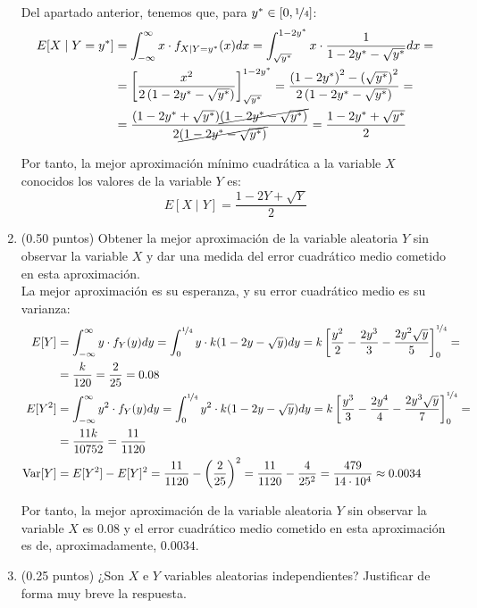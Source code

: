 \documentclass[12pt]{article}
\DeclareMathOperator{\Var}{Var}
\begin{document}
\begin{ejercicio}[5 puntos]
\begin{enumerate}
            Del apartado anterior, tenemos que, para $y^*\in \left[0,\nicefrac{1}{4}\right]$:
            \begin{align*}
                E[X\mid Y=y^*] &= \int_{-\infty}^{\infty} x\cdot f_{X\mid Y=y^*}(x)dx
                = \int_{\sqrt{y^*}}^{1-2y^*} x\cdot \dfrac{1}{1-2y^*-\sqrt{y^*}}dx
                =\\&= \left[\dfrac{x^2}{2\left(1-2y^*-\sqrt{y^*}\right)}\right]_{\sqrt{y^*}}^{1-2y^*}
                = \dfrac{\left(1-2y^*\right)^2-\left(\sqrt{y^*}\right)^2}{2\left(1-2y^*-\sqrt{y^*}\right)}
                =\\&= \dfrac{(1-2y^*+\sqrt{y^*})\cancel{(1-2y^*-\sqrt{y^*})}}{2\cancel{(1-2y^*-\sqrt{y^*})}}
                = \dfrac{1-2y^*+\sqrt{y^*}}{2}
            \end{align*}

            Por tanto, la mejor aproximación mínimo cuadrática a la variable $X$ conocidos los valores de la variable $Y$ es:
            \begin{equation*}
                E[X\mid Y] = \dfrac{1-2Y+\sqrt{Y}}{2}
            \end{equation*}
            \item (0.50 puntos) Obtener la mejor aproximación de la variable aleatoria $Y$ sin observar la variable $X$ y dar una medida del error cuadrático medio cometido en esta aproximación.\\
            
            La mejor aproximación es su esperanza, y su error cuadrático medio es su varianza:
            \begin{align*}
                E[Y] &= \int_{-\infty}^{\infty} y\cdot f_Y(y)dy = \int_{0}^{\nicefrac{1}{4}} y\cdot k(1-2y-\sqrt{y})dy
                = k\left[\dfrac{y^2}{2}-\dfrac{2y^3}{3}-\dfrac{2y^2\sqrt{y}}{5}\right]_{0}^{\nicefrac{1}{4}} =\\&= \dfrac{k}{120} = \dfrac{2}{25} = 0.08\\
                E[Y^2] &= \int_{-\infty}^{\infty} y^2\cdot f_Y(y)dy = \int_{0}^{\nicefrac{1}{4}} y^2\cdot k(1-2y-\sqrt{y})dy
                = k\left[\dfrac{y^3}{3}-\dfrac{2y^4}{4}-\dfrac{2y^3\sqrt{y}}{7}\right]_{0}^{\nicefrac{1}{4}} =\\&= \dfrac{11k}{10752} = \dfrac{11}{1120}\\
                \Var[Y] &= E[Y^2] - E[Y]^2 = \dfrac{11}{1120} - \left(\dfrac{2}{25}\right)^2 = \dfrac{11}{1120} - \dfrac{4}{25^2} = \dfrac{479}{14\cdot 10^4} \approx 0.0034
            \end{align*}

            Por tanto, la mejor aproximación de la variable aleatoria $Y$ sin observar la variable $X$ es $0.08$ y el error cuadrático medio cometido en esta aproximación es de, aproximadamente, $0.0034$.
            \item (0.25 puntos) ¿Son $X$ e $Y$ variables aleatorias independientes? Justificar de forma muy breve la respuesta.
        \end{enumerate}
    \end{ejercicio}
\end{document}
